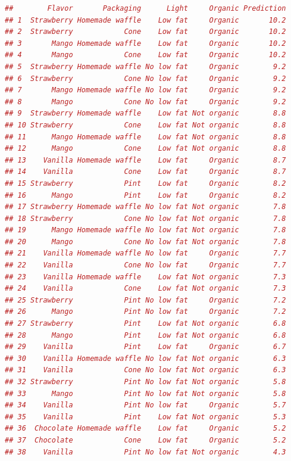 \documentclass{article}
\begin{document}
\begin{lstlisting}[language=R]
##        Flavor       Packaging      Light     Organic Prediction
## 1  Strawberry Homemade waffle    Low fat     Organic       10.2
## 2  Strawberry            Cone    Low fat     Organic       10.2
## 3       Mango Homemade waffle    Low fat     Organic       10.2
## 4       Mango            Cone    Low fat     Organic       10.2
## 5  Strawberry Homemade waffle No low fat     Organic        9.2
## 6  Strawberry            Cone No low fat     Organic        9.2
## 7       Mango Homemade waffle No low fat     Organic        9.2
## 8       Mango            Cone No low fat     Organic        9.2
## 9  Strawberry Homemade waffle    Low fat Not organic        8.8
## 10 Strawberry            Cone    Low fat Not organic        8.8
## 11      Mango Homemade waffle    Low fat Not organic        8.8
## 12      Mango            Cone    Low fat Not organic        8.8
## 13    Vanilla Homemade waffle    Low fat     Organic        8.7
## 14    Vanilla            Cone    Low fat     Organic        8.7
## 15 Strawberry            Pint    Low fat     Organic        8.2
## 16      Mango            Pint    Low fat     Organic        8.2
## 17 Strawberry Homemade waffle No low fat Not organic        7.8
## 18 Strawberry            Cone No low fat Not organic        7.8
## 19      Mango Homemade waffle No low fat Not organic        7.8
## 20      Mango            Cone No low fat Not organic        7.8
## 21    Vanilla Homemade waffle No low fat     Organic        7.7
## 22    Vanilla            Cone No low fat     Organic        7.7
## 23    Vanilla Homemade waffle    Low fat Not organic        7.3
## 24    Vanilla            Cone    Low fat Not organic        7.3
## 25 Strawberry            Pint No low fat     Organic        7.2
## 26      Mango            Pint No low fat     Organic        7.2
## 27 Strawberry            Pint    Low fat Not organic        6.8
## 28      Mango            Pint    Low fat Not organic        6.8
## 29    Vanilla            Pint    Low fat     Organic        6.7
## 30    Vanilla Homemade waffle No low fat Not organic        6.3
## 31    Vanilla            Cone No low fat Not organic        6.3
## 32 Strawberry            Pint No low fat Not organic        5.8
## 33      Mango            Pint No low fat Not organic        5.8
## 34    Vanilla            Pint No low fat     Organic        5.7
## 35    Vanilla            Pint    Low fat Not organic        5.3
## 36  Chocolate Homemade waffle    Low fat     Organic        5.2
## 37  Chocolate            Cone    Low fat     Organic        5.2
## 38    Vanilla            Pint No low fat Not organic        4.3

\end{lstlisting}
\end{document}

